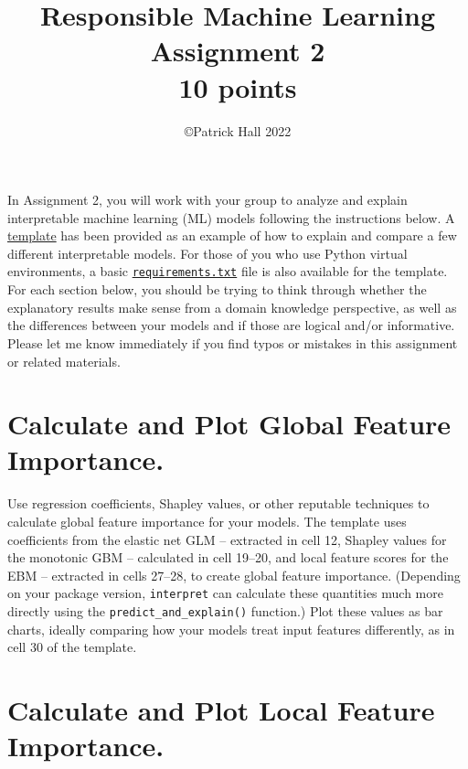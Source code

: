 \documentclass[fleqn]{article}
\title{Responsible Machine Learning\\\Large{Assignment 2}\\\Large{10 points}}
\author{\copyright Patrick Hall 2022}
\begin{document}
\maketitle

\noindent In Assignment 2, you will work with your group to analyze and explain interpretable machine learning (ML) models following the instructions below. A \href{https://nbviewer.jupyter.org/github/jphall663/GWU_rml/blob/master/assignments/assignment_2/assign_2_template.ipynb?flush_cache=true}{template} has been provided as an example of how to explain and compare a few different interpretable models. For those of you who use Python virtual environments, a basic \href{https://github.com/jphall663/GWU_rml/blob/master/assignments/requirements.txt}{\texttt{requirements.txt}} file is also available for the template.\\

\noindent For each section below, you should be trying to think through whether the explanatory results make sense from a domain knowledge perspective, as well as the differences between your models and if those are logical and/or informative.\\

\noindent Please let me know immediately if you find typos or mistakes in this assignment or related materials. 

\section{Calculate and Plot Global Feature Importance.}\label{global_fi}

Use regression coefficients, Shapley values, or other reputable techniques to calculate global feature importance for your models. The template uses coefficients from the elastic net GLM -- extracted in cell 12, Shapley values for the monotonic GBM -- calculated in cell 19--20, and local feature scores for the EBM -- extracted in cells 27--28, to create global feature importance. (Depending on your package version, \texttt{interpret} can calculate these quantities much more directly using the \texttt{predict\_and\_explain()} function.) Plot these values as bar charts, ideally comparing how your models treat input features differently, as in cell 30 of the template.\\

\section{Calculate and Plot Local Feature Importance.}
\end{document}
